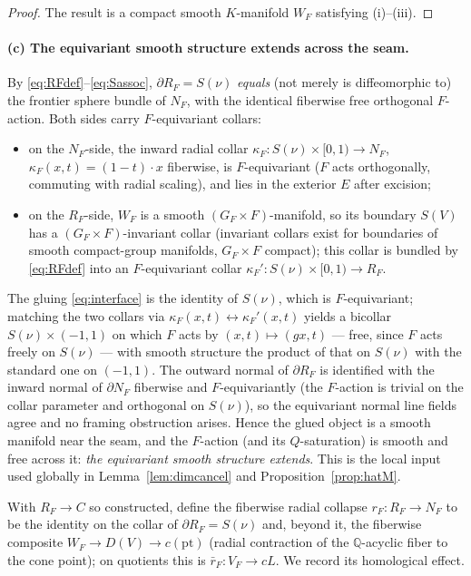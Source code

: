 \documentclass[12pt]{article}
\theoremstyle{definition}
\begin{document}
\begin{proof}
The result is a compact smooth $K$-manifold $W_F$ satisfying (i)--(iii).
\end{proof}

\paragraph{(c) The equivariant smooth structure extends across the seam.}
By \eqref{eq:RFdef}--\eqref{eq:Sassoc}, $\partial R_F=S(\nu)$ \emph{equals} (not
merely is diffeomorphic to) the frontier sphere bundle of $N_F$, with the
identical fiberwise free orthogonal $F$-action. Both sides carry $F$-equivariant
collars:
\begin{itemize}
\item on the $N_F$-side, the inward radial collar
$\kappa_F\colon S(\nu)\times[0,1)\to N_F$, $\kappa_F(x,t)=(1-t)\cdot x$
fiberwise, is $F$-equivariant ($F$ acts orthogonally, commuting with radial
scaling), and lies in the exterior $E$ after excision;
\item on the $R_F$-side, $W_F$ is a smooth $(G_F\times F)$-manifold, so its
boundary $S(V)$ has a $(G_F\times F)$-invariant collar (invariant collars exist
for boundaries of smooth compact-group manifolds, $G_F\times F$ compact); this
collar is bundled by \eqref{eq:RFdef} into an $F$-equivariant collar
$\kappa_F'\colon S(\nu)\times[0,1)\to R_F$.
\end{itemize}
The gluing \eqref{eq:interface} is the identity of $S(\nu)$, which is
$F$-equivariant; matching the two collars via
$\kappa_F(x,t)\leftrightarrow\kappa_F'(x,t)$ yields a bicollar
$S(\nu)\times(-1,1)$ on which $F$ acts by $(x,t)\mapsto(gx,t)$ --- free, since
$F$ acts freely on $S(\nu)$ --- with smooth structure the product of that on
$S(\nu)$ with the standard one on $(-1,1)$. The outward normal of
$\partial R_F$ is identified with the inward normal of $\partial N_F$ fiberwise
and $F$-equivariantly (the $F$-action is trivial on the collar parameter and
orthogonal on $S(\nu)$), so the equivariant normal line fields agree and no
framing obstruction arises. Hence the glued object is a smooth manifold near the
seam, and the $F$-action (and its $Q$-saturation) is smooth and free across it:
\emph{the equivariant smooth structure extends}. This is the local input used
globally in Lemma~\ref{lem:dimcancel} and Proposition~\ref{prop:hatM}.

\medskip
With $R_F\to C$ so constructed, define the fiberwise radial collapse
$r_F\colon R_F\to N_F$ to be the identity on the collar of
$\partial R_F=S(\nu)$ and, beyond it, the fiberwise composite
$W_F\to D(V)\to c(\mathrm{pt})$ (radial contraction of the $\mathbb{Q}$-acyclic
fiber to the cone point); on quotients this is $\bar r_F\colon V_F\to cL$. We
record its homological effect.
\end{document}
